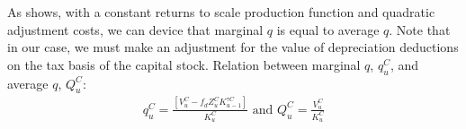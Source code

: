 As \citet{Hayashi1982} shows,  with a constant returns to scale production function and quadratic adjustment costs, we can device that marginal $q$ is equal to average $q$.  Note that in our case, we must make an adjustment for the value of depreciation deductions on the tax basis of the capital stock.  Relation between marginal $q$, $q^{C}_{u}$, and average $q$, $Q^{C}_{u}$:
 \begin{equation}
\label{eqn:avg_q}
\begin{split}
q^{C}_{u}=\frac{[V^{C}_{u}-f_{d}Z^{C}_{u}K^{\tau C}_{u-1}]}{K^{C}_{u}} \text{ and } Q^{C}_{u}=\frac{V^{C}_{u}}{K^{C}_{u}}
\end{split}
\end{equation}

%
%

